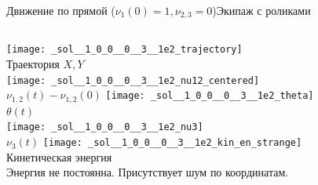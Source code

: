 \documentclass{beamer}
\begin{document}
\begin{frame}{Движение по прямой ($\nu_1(0) = 1, \nu_{2,3} = 0$)}{Экипаж с роликами}
    \begin{columns}
            \centering
            \texttt{[image: \_sol\_\_1\_0\_0\_\_0\_\_3\_\_1e2\_trajectory]} \\
            Траектория $X, Y$ \\
            \texttt{[image: \_sol\_\_1\_0\_0\_\_0\_\_3\_\_1e2\_nu12\_centered]} \\
            $\nu_{1,2}(t) - \nu_{1,2}(0)$
            \centering
            \texttt{[image: \_sol\_\_1\_0\_0\_\_0\_\_3\_\_1e2\_theta]} \\
            $\theta(t)$ \\
            \texttt{[image: \_sol\_\_1\_0\_0\_\_0\_\_3\_\_1e2\_nu3]} \\
            $\nu_3(t)$
            \centering
            \texttt{[image: \_sol\_\_1\_0\_0\_\_0\_\_3\_\_1e2\_kin\_en\_strange]} \\
            Кинетическая энергия \\
            \vspace{15pt}
            Энергия не постоянна. Присутствует шум по координатам.
    \end{columns}
\end{frame}
\end{document}
